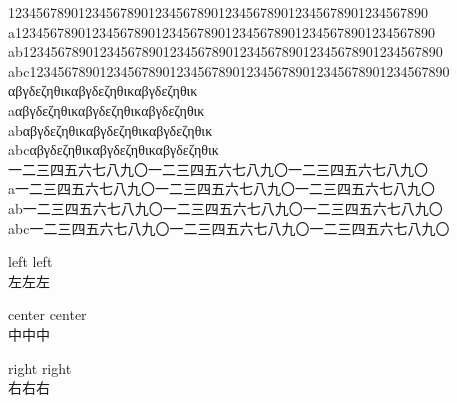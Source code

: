 \documentclass{jarticle}
\begin{document}
123456789012345678901234567890123456789012345678901234567890\\
a123456789012345678901234567890123456789012345678901234567890\\
ab123456789012345678901234567890123456789012345678901234567890\\
abc123456789012345678901234567890123456789012345678901234567890\\

αβγδεζηθικαβγδεζηθικαβγδεζηθικ\\
aαβγδεζηθικαβγδεζηθικαβγδεζηθικ\\
abαβγδεζηθικαβγδεζηθικαβγδεζηθικ\\
abcαβγδεζηθικαβγδεζηθικαβγδεζηθικ\\

一二三四五六七八九〇一二三四五六七八九〇一二三四五六七八九〇\\
a一二三四五六七八九〇一二三四五六七八九〇一二三四五六七八九〇\\
ab一二三四五六七八九〇一二三四五六七八九〇一二三四五六七八九〇\\
abc一二三四五六七八九〇一二三四五六七八九〇一二三四五六七八九〇\\

\begin{flushleft}
left left\\
左左左
\end{flushleft}

\begin{center}
center center\\
中中中
\end{center}

\begin{flushright}
right right\\
右右右
\end{flushright}
\end{document}
